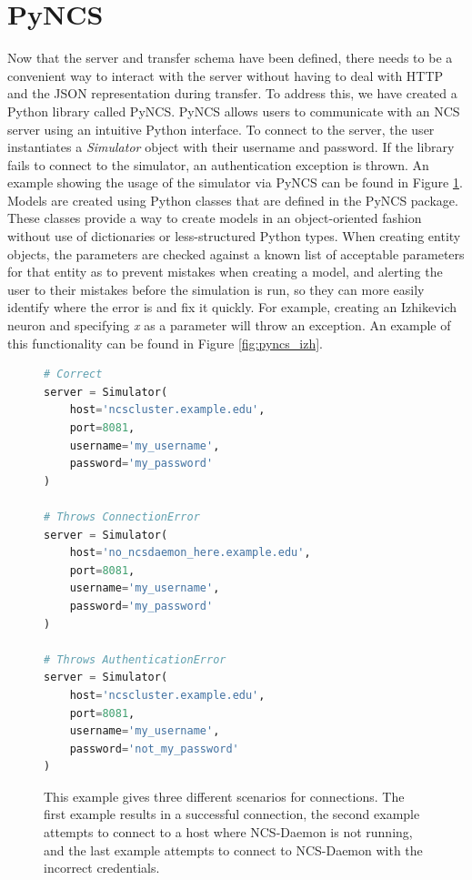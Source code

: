 \section{PyNCS}

Now that the server and transfer schema have been defined, there needs to be a convenient way to interact with the server without having to deal with HTTP and the JSON representation during transfer. To address this, we have created a Python library called PyNCS. PyNCS allows users to communicate with an NCS server using an intuitive Python interface. To connect to the server, the user instantiates a \emph{Simulator} object with their username and password. If the library fails to connect to the simulator, an authentication exception is thrown. An example showing the usage of the simulator via PyNCS can be found in Figure \ref{fig:simulator_connection}. Models are created using Python classes that are defined in the PyNCS package. These classes provide a way to create models in an object-oriented fashion without use of dictionaries or less-structured Python types. When creating entity objects, the parameters are checked against a known list of acceptable parameters for that entity as to prevent mistakes when creating a model, and alerting the user to their mistakes before the simulation is run, so they can more easily identify where the error is and fix it quickly. For example, creating an Izhikevich neuron and specifying \emph{x} as a parameter will throw an exception. An example of this functionality can be found in Figure \ref{fig:pyncs_izh}.

\begin{figure}
\begin{center}
\begin{lstlisting}[language=Python]
# Correct
server = Simulator(
    host='ncscluster.example.edu',
    port=8081,
    username='my_username',
    password='my_password'
)

# Throws ConnectionError
server = Simulator(
    host='no_ncsdaemon_here.example.edu',
    port=8081,
    username='my_username',
    password='my_password'
)

# Throws AuthenticationError
server = Simulator(
    host='ncscluster.example.edu',
    port=8081,
    username='my_username',
    password='not_my_password'
)
\end{lstlisting}
\caption[PyNCS Simulator Example]{This example gives three different scenarios for connections. The first example results in a successful connection, the second example attempts to connect to a host where NCS-Daemon is not running, and the last example attempts to connect to NCS-Daemon with the incorrect credentials.\label{fig:simulator_connection}}
\end{center}
\end{figure}

